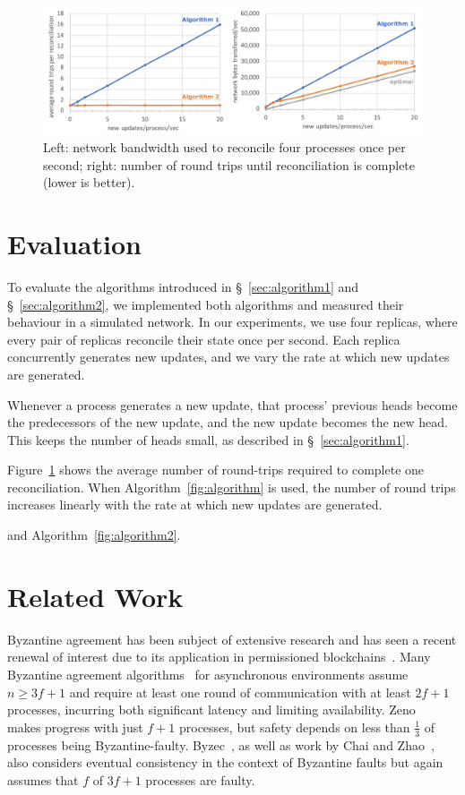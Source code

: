 \documentclass[a4paper,anonymous,USenglish]{lipics-v2019}
\begin{document}
\begin{figure}
  \includegraphics[width=\textwidth,keepaspectratio=true]{figs/evaluation.pdf}
  \caption{Left: network bandwidth used to reconcile four processes once per second; right: number of round trips until reconciliation is complete (lower is better).}
  \label{fig:evaluation}
\end{figure}

\section{Evaluation}

To evaluate the algorithms introduced in \S~\ref{sec:algorithm1} and \S~\ref{sec:algorithm2}, we implemented both algorithms and measured their behaviour in a simulated network.
In our experiments, we use four replicas, where every pair of replicas reconcile their state once per second.
Each replica concurrently generates new updates, and we vary the rate at which new updates are generated.

Whenever a process generates a new update, that process' previous heads become the predecessors of the new update, and the new update becomes the new head.
This keeps the number of heads small, as described in \S~\ref{sec:algorithm1}.

Figure~\ref{fig:evaluation} shows the average number of round-trips required to complete one reconciliation.
When Algorithm~\ref{fig:algorithm} is used, the number of round trips increases linearly with the rate at which new updates are generated.

and Algorithm~\ref{fig:algorithm2}.


\section{Related Work}

Byzantine agreement has been subject of extensive research and has seen a recent renewal of interest due to its application in permissioned blockchains~\cite{Bano:2019}.
Many Byzantine agreement algorithms~\cite{Castro:1999,Kotla:2007,Bessani:2014,Aublin:2015,Cowling:2006,Abd:2005} for asynchronous environments assume $n \ge 3f+1$ and require at least one round of communication with at least $2f+1$ processes, incurring both significant latency and limiting availability.
Zeno~\cite{Singh:2009} makes progress with just $f+1$ processes, but safety depends on less than $\frac{1}{3}$ of processes being Byzantine-faulty.
Byzec~\cite{Shoker:2017}, as well as work by Chai and Zhao~\cite{Chai:2014}, also considers eventual consistency in the context of Byzantine faults but again assumes that $f$ of $3f+1$ processes are faulty.
\end{document}
